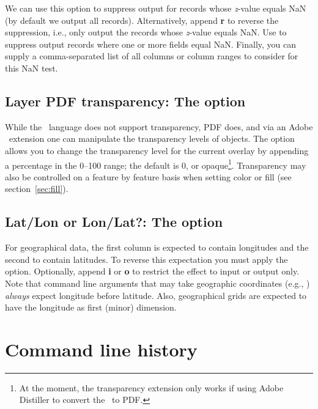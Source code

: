 We can use this option to suppress output for records whose {\it z}-value equals NaN
(by default we output all records).  Alternatively, append {\bf r} to reverse the suppression,
i.e., only output the records whose {\it z}-value equals NaN.  Use  to suppress
output records where one or more fields equal NaN.  Finally, you can supply
a comma-separated list of all columns or column ranges to consider for this NaN test.

\subsection{Layer PDF transparency: The  option}
\label{sec:ltransp}

While the \PS\ language does not support transparency, PDF does, and via an Adobe \PS\ extension
one can manipulate the transparency levels of objects.  The  option allows you to change
the transparency level for the current overlay by appending a percentage in the 0--100 range; the
default is 0, or opaque\footnote{At the moment, the transparency extension only works if
using Adobe Distiller to convert the \PS\ to PDF.}.  Transparency may also be controlled
on a feature by feature basis when setting color or fill (see section~\ref{sec:fill}).

\subsection{Lat/Lon or Lon/Lat?: The \Opt{:} option}

For geographical data, the first column is expected to contain longitudes
and the second to contain latitudes.  To reverse this expectation you must
apply the \Opt{:} option.  Optionally, append \textbf{i} or \textbf{o} to restrict
the effect to input or output only.  Note that command line arguments that may take
geographic coordinates (e.g., ) \emph{always} expect longitude before
latitude. Also, geographical grids are expected to have the longitude as
first (minor) dimension.

%

\section{Command line history}
\label{sec:gmtcommands}

